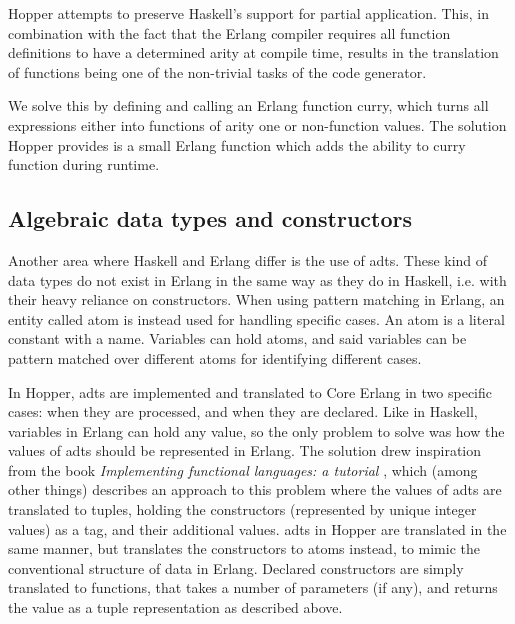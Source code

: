 Hopper attempts to preserve Haskell's support for partial application. This, in combination with the fact that the Erlang compiler requires all function definitions to have a determined arity at compile time, results in the translation of functions being one of the non-trivial tasks of the code generator.%

We solve this by defining and calling an Erlang function curry, which turns all expressions either into functions of arity one or non-function values. The solution Hopper provides is a small Erlang function which adds the ability to curry function during runtime. 

\subsection{Algebraic data types and constructors}

Another area where Haskell and Erlang differ is the use of \glspl{adt}. These kind of data types do not exist in Erlang in the same way as they do in Haskell, i.e. with their heavy reliance
on constructors. When using pattern matching in Erlang, an entity called atom is instead used for
handling specific cases. An atom is a literal constant with a name. Variables can hold atoms, and said variables can be pattern matched over different atoms for identifying different cases. %

In Hopper, \glspl{adt} are implemented and translated to Core Erlang in two specific cases: when they are processed, and when they are declared. Like in Haskell, variables in Erlang can
hold any value, so the only problem to solve was how the values of \glspl{adt} should be represented in Erlang. The solution drew inspiration from the book \textit{Implementing functional languages: a tutorial} \cite{FunTutorial}, which (among other things) describes an approach to this problem where the values of \glspl{adt} are translated to tuples, holding the constructors (represented by unique integer values) as a tag, and their additional values. %
\Glspl{adt} in Hopper are translated in the same manner, but translates the constructors to atoms instead, to mimic the conventional structure of data in Erlang. Declared constructors are simply translated to functions, that takes a number of parameters (if any), and returns the value as a tuple representation as described above. %


